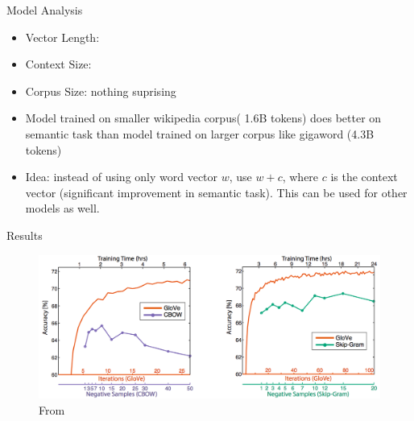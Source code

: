 \begin{frame}{Model Analysis}
  \begin{itemize}
  \item Vector Length:
  \item Context Size: 
  \item Corpus Size: nothing suprising
  \item Model trained on smaller wikipedia corpus( 1.6B tokens) does better on semantic task than model trained on larger corpus like gigaword (4.3B tokens)
  \item Idea: instead of using only word vector $w$, use $w+c$, where $c$ is the context vector (significant improvement in semantic task). This can be used for other models as well.
  \end{itemize}
\end{frame}

\begin{frame}{Results}
  \begin{figure}
    \includegraphics[scale=0.27]{images/gloveVSword2vec.png}
    \caption{From}
  \end{figure}
\end{frame}

